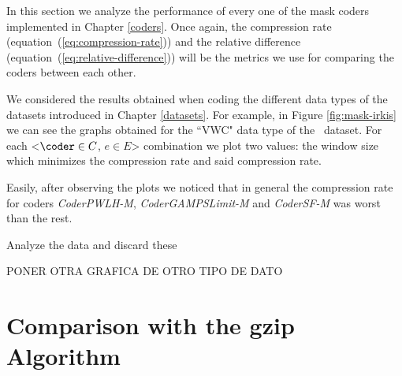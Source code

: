 In this section we analyze the performance of every one of the mask coders implemented in Chapter \ref{coders}. Once again, the compression rate (equation~(\ref{eq:compression-rate})) and the relative difference (equation~(\ref{eq:relative-difference})) will be the metrics we use for comparing the coders between each other.

We considered the results obtained when coding the different data types of the datasets introduced in Chapter \ref{datasets}. For example, in Figure \ref{fig:mask-irkis} we can see the graphs obtained for the ``VWC" data type of the \datasetirkis \ dataset. For each <$\coder \in C$, $e \in E$> combination we plot two values: the window size which minimizes the compression rate and said compression rate.

Easily, after observing the plots we noticed that in general the compression rate for coders \textit{CoderPWLH-M}, \textit{CoderGAMPSLimit-M} and \textit{CoderSF-M} was worst than the rest.

Analyze the data and discard these 

PONER OTRA GRAFICA DE OTRO TIPO DE DATO

\clearpage


\clearpage



\clearpage

\clearpage







\clearpage
\section{Comparison with the gzip Algorithm}
\label{secX:gzip}